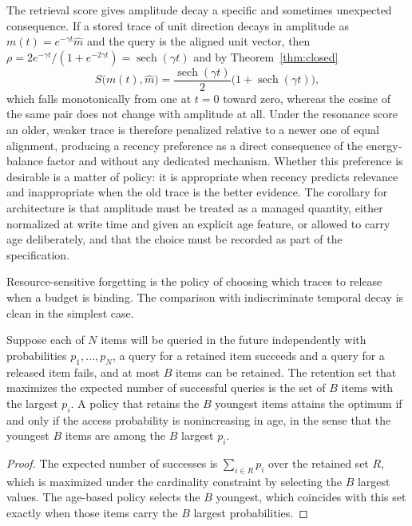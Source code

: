 The retrieval score gives amplitude decay a specific and sometimes unexpected consequence. If a stored trace of unit direction decays in amplitude as $m(t)=e^{-\gamma t}\hat m$ and the query is the aligned unit vector, then $\rho=2e^{-\gamma t}/(1+e^{-2\gamma t})=\operatorname{sech}(\gamma t)$ and by Theorem~\ref{thm:closed}
\begin{equation}\label{eq:decayscore}
S\bigl(m(t),\hat m\bigr)=\frac{\operatorname{sech}(\gamma t)}{2}\bigl(1+\operatorname{sech}(\gamma t)\bigr),
\end{equation}
which falls monotonically from one at $t=0$ toward zero, whereas the cosine of the same pair does not change with amplitude at all. Under the resonance score an older, weaker trace is therefore penalized relative to a newer one of equal alignment, producing a recency preference as a direct consequence of the energy-balance factor and without any dedicated mechanism. Whether this preference is desirable is a matter of policy: it is appropriate when recency predicts relevance and inappropriate when the old trace is the better evidence. The corollary for architecture is that amplitude must be treated as a managed quantity, either normalized at write time and given an explicit age feature, or allowed to carry age deliberately, and that the choice must be recorded as part of the specification.

Resource-sensitive forgetting is the policy of choosing which traces to release when a budget is binding. The comparison with indiscriminate temporal decay is clean in the simplest case.

\begin{proposition}\label{prop:retention}
Suppose each of $N$ items will be queried in the future independently with probabilities $p_1,\dots,p_N$, a query for a retained item succeeds and a query for a released item fails, and at most $B$ items can be retained. The retention set that maximizes the expected number of successful queries is the set of $B$ items with the largest $p_i$. A policy that retains the $B$ youngest items attains the optimum if and only if the access probability is nonincreasing in age, in the sense that the youngest $B$ items are among the $B$ largest $p_i$.
\end{proposition}

\begin{proof}
The expected number of successes is $\sum_{i\in R}p_i$ over the retained set $R$, which is maximized under the cardinality constraint by selecting the $B$ largest values. The age-based policy selects the $B$ youngest, which coincides with this set exactly when those items carry the $B$ largest probabilities.
\end{proof}


